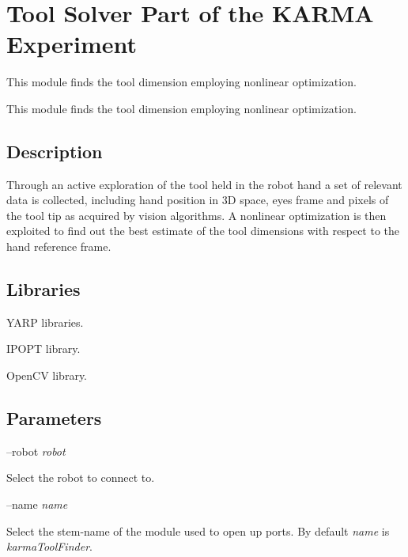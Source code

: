 \section{Tool Solver Part of the K\+A\+R\+MA Experiment}
\label{group__karmaToolFinder}


This module finds the tool dimension employing nonlinear optimization.  


This module finds the tool dimension employing nonlinear optimization. 

\hypertarget{group__karmaToolProjection_intro_sec}{}\subsection{Description}\label{group__karmaToolProjection_intro_sec}
Through an active exploration of the tool held in the robot hand a set of relevant data is collected, including hand position in 3D space, eye\textquotesingle{}s frame and pixels of the tool tip as acquired by vision algorithms. A nonlinear optimization is then exploited to find out the best estimate of the tool dimensions with respect to the hand reference frame.\hypertarget{group__karmaToolProjection_lib_sec}{}\subsection{Libraries}\label{group__karmaToolProjection_lib_sec}

\begin{DoxyItemize}
\item Y\+A\+RP libraries.
\item I\+P\+O\+PT library.
\item Open\+CV library.
\end{DoxyItemize}\hypertarget{group__karmaToolProjection_parameters_sec}{}\subsection{Parameters}\label{group__karmaToolProjection_parameters_sec}
--robot {\itshape robot} 
\begin{DoxyItemize}
\item Select the robot to connect to.
\end{DoxyItemize}

--name {\itshape name} 
\begin{DoxyItemize}
\item Select the stem-\/name of the module used to open up ports. By default {\itshape name} is {\itshape karma\+Tool\+Finder}.
\end{DoxyItemize}

